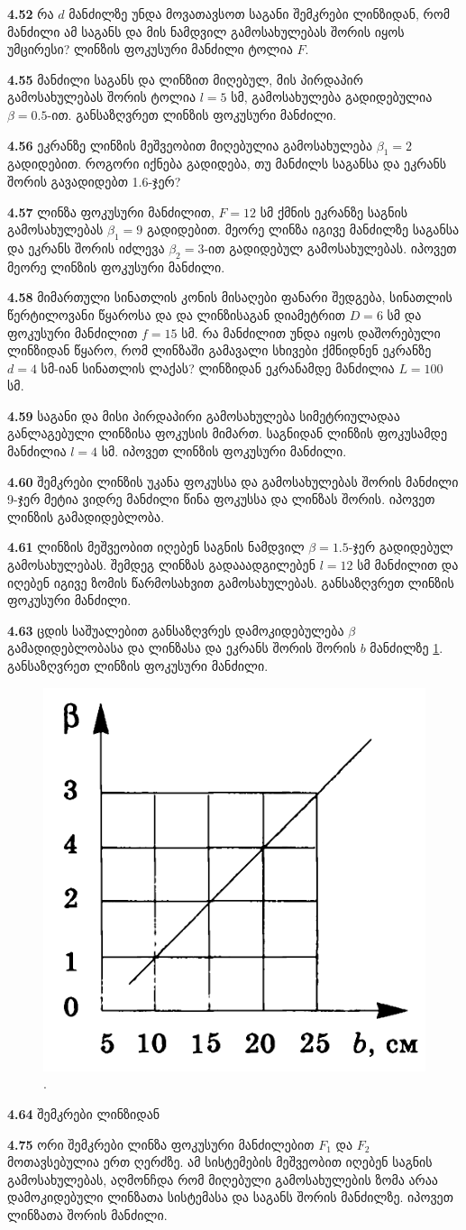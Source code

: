 \documentclass[a4paper]{book}
\begin{document}
\textbf{4.52} რა $d$ მანძილზე უნდა მოვათავსოთ საგანი შემკრები ლინზიდან, რომ მანძილი ამ საგანს და მის ნამდვილ გამოსახულებას შორის იყოს უმცირესი? ლინზის ფოკუსური მანძილი ტოლია $F$.

\textbf{4.55} მანძილი საგანს და ლინზით მიღებულ, მის პირდაპირ გამოსახულებას შორის ტოლია $l = 5$ სმ, გამოსახულება გადიდებულია $\beta = 0.5$-ით. განსაზღვრეთ ლინზის ფოკუსური მანძილი.

\textbf{4.56} ეკრანზე ლინზის მეშვეობით მიღებულია გამოსახულება $\beta_1 = 2$ გადიდებით. როგორი იქნება გადიდება, თუ მანძილს საგანსა და ეკრანს შორის გავადიდებთ 1.6-ჯერ?

\textbf{4.57} ლინზა ფოკუსური მანძილით, $F = 12$ სმ ქმნის ეკრანზე საგნის გამოსახულებას $\beta_1 = 9$ გადიდებით. მეორე ლინზა იგივე მანძილზე საგანსა და ეკრანს შორის იძლევა $\beta_2 = 3$-ით გადიდებულ გამოსახულებას. იპოვეთ მეორე ლინზის ფოკუსური მანძილი.

\textbf{4.58} მიმართული სინათლის კონის მისაღები ფანარი შედგება, სინათლის წერტილოვანი წყაროსა და და ლინზისაგან დიამეტრით $D = 6$ სმ და ფოკუსური მანძილით $f = 15$  სმ. რა მანძილით უნდა იყოს დაშორებული ლინზიდან წყარო, რომ ლინზაში გამავალი სხივები ქმნიდნენ ეკრანზე $d = 4$ სმ-იან სინათლის ლაქას? ლინზიდან ეკრანამდე მანძილია $L = 100$ სმ.

\textbf{4.59} საგანი და მისი პირდაპირი გამოსახულება სიმეტრიულადაა განლაგებული ლინზისა ფოკუსის მიმართ. საგნიდან ლინზის ფოკუსამდე მანძილია $l = 4$ სმ. იპოვეთ ლინზის ფოკუსური მანძილი.

\textbf{4.60} შემკრები ლინზის უკანა ფოკუსსა და გამოსახულებას შორის მანძილი 9-ჯერ მეტია ვიდრე მანძილი წინა ფოკუსსა და ლინზას შორის. იპოვეთ ლინზის გამადიდებლობა.
       
\textbf{4.61} ლინზის მეშვეობით იღებენ საგნის ნამდვილ $\beta = 1.5$-ჯერ გადიდებულ გამოსახულებას. შემდეგ ლინზას გადააადგილებენ $l = 12$ სმ მანძილით და იღებენ იგივე ზომის წარმოსახვით გამოსახულებას. განსაზღვრეთ ლინზის ფოკუსური მანძილი.

\textbf{4.63} ცდის საშუალებით განსაზღვრეს დამოკიდებულება $\beta$ გამადიდებლობასა და ლინზასა და ეკრანს შორის შორის $b$ მანძილზე \ref{fig:4_63}. განსაზღვრეთ ლინზის ფოკუსური მანძილი.
	\begin{figure}[h]
		   \centering
           \includegraphics[width=0.4\columnwidth]{figures/4_63}
           \caption{.}
           \label{fig:4_63}
        \end{figure}

\textbf{4.64} შემკრები ლინზიდან

\textbf{4.75} ორი შემკრები ლინზა ფოკუსური მანძილებით $F_1$ და $F_2$ მოთავსებულია ერთ ღერძზე. ამ სისტემების მეშვეობით იღებენ საგნის გამოსახულებას, აღმონჩდა რომ მიღებული გამოსახულების ზომა არაა დამოკიდებული ლინზათა სისტემასა და საგანს შორის მანძილზე. იპოვეთ ლინზათა შორის მანძილი. 
\end{document}
